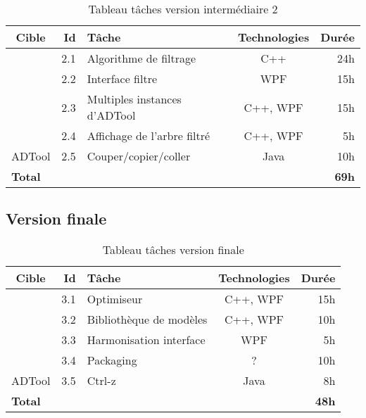 		\begin{table}[h]
			\centering
			\begin{tabular}{|c|r|l|c|r|}
				\hline
				\textbf{Cible} & \textbf{Id} & \textbf{Tâche} & \textbf{Technologies} & \textbf{Durée}\\
				\hline

				\multirow{4}{*}{\glasir{}} & 2.1 & Algorithme de filtrage & C++ & 24h\\
				\cline{2-5}
				 & 2.2 & Interface filtre & WPF & 15h\\
				\cline{2-5}
				 & 2.3 & Multiples instances d'ADTool & C++, WPF & 15h\\
				\cline{2-5}
				 & 2.4 & Affichage de l'arbre filtré & C++, WPF & 5h\\
				\hline

				\multirow{1}{*}{ADTool} & 2.5 & Couper/copier/coller & \multirow{1}{*}{Java} & 10h\\
				\hline

				\multicolumn{4}{|l|}{\bf Total} & {\bf 69h}\\
				\hline
			\end{tabular}
			\caption{Tableau tâches version intermédiaire 2}
			\label{fig:taches_units_2}
		\end{table}

	\subsection{Version finale}

		\begin{table}[h]
			\centering
			\begin{tabular}{|c|r|l|c|r|}
				\hline
				\textbf{Cible} & \textbf{Id} & \textbf{Tâche} & \textbf{Technologies} & \textbf{Durée}\\
				\hline

				\multirow{4}{*}{\glasir{}} & 3.1 & Optimiseur & C++, WPF & 15h\\
				\cline{2-5}
				 & 3.2 & Bibliothèque de modèles & C++, WPF & 10h\\
				\cline{2-5}
				 & 3.3 & Harmonisation interface & WPF & 5h\\
				\cline{2-5}
				 & 3.4 & Packaging & ? & 10h\\
				\hline

				\multirow{1}{*}{ADTool} & 3.5 & Ctrl-z & \multirow{1}{*}{Java} & 8h\\
				\hline

				\multicolumn{4}{|l|}{\bf Total} & {\bf 48h}\\
				\hline
			\end{tabular}
			\caption{Tableau tâches version finale}
			\label{fig:taches_units_3}
		\end{table}